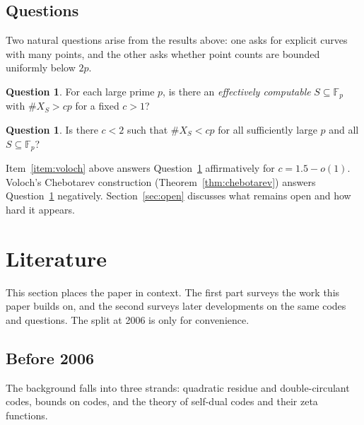 \documentclass[12pt,letterpaper]{article}
\theoremstyle{definition}
\newtheorem{question}[theorem]{Question}
\theoremstyle{remark}
\numberwithin{equation}{section}
\newcommand{\Fp}{\mathbb{F}_p}
\newcommand{\X}{\#X}
\begin{document}
\subsection{Questions}
Two natural questions arise from the results above: one asks for explicit curves
with many points, and the other asks whether point counts are bounded uniformly
below $2p$.

\begin{question}\label{q:1}
For each large prime $p$, is there an \emph{effectively computable} $S\subseteq\Fp$
with $\X_S>cp$ for a fixed $c>1$?
\end{question}
\begin{question}\label{q:2}
Is there $c<2$ such that $\X_S<cp$ for all sufficiently large $p$ and all
$S\subseteq\Fp$?
\end{question}
Item~\ref{item:voloch} above answers Question~\ref{q:1} affirmatively for $c=1.5-o(1)$. Voloch's Chebotarev
construction (Theorem~\ref{thm:chebotarev}) answers Question~\ref{q:2} negatively.
Section~\ref{sec:open} discusses what remains open and how hard it appears.

\section{Literature}
\label{sec:lit}

This section places the paper in context. The first part surveys the work this
paper builds on, and the second surveys later developments on the same codes and
questions. The split at 2006 is only for convenience.

\subsection{Before 2006}
The background falls into three strands: quadratic residue and double-circulant
codes, bounds on codes, and the theory of self-dual codes and their zeta functions.
\end{document}
